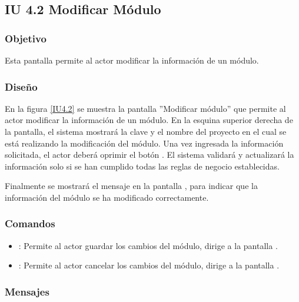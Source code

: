 \subsection{IU 4.2 Modificar Módulo}

\subsubsection{Objetivo}
	Esta pantalla permite al actor modificar la información de un módulo.
\subsubsection{Diseño}
	En la figura \ref{IU4.2} se muestra la pantalla ''Modificar módulo'' que permite al actor modificar la información de un módulo. En la esquina superior derecha de la pantalla, el sistema mostrará la clave y el nombre del proyecto en el cual se está realizando la modificación del módulo.
	Una vez ingresada la información solicitada, el actor deberá oprimir el botón  . El sistema validará y actualizará la información solo si se han cumplido todas las reglas de negocio establecidas.
	
	Finalmente se mostrará el mensaje  en la pantalla , para indicar que la información del módulo se ha modificado correctamente.

\label{IU4.2}
\subsubsection{Comandos}
\begin{itemize}
	\item {}: Permite al actor guardar los cambios del módulo, dirige a la pantalla .
	\item {}: Permite al actor cancelar los cambios del módulo, dirige a la pantalla .
\end{itemize}

\subsubsection{Mensajes}

